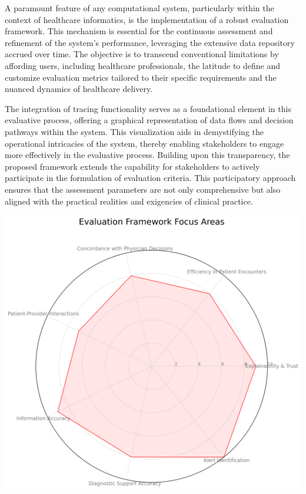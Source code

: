 \documentclass{article}
\begin{document}
A paramount feature of any computational system, particularly within the context of healthcare informatics, is the implementation of a robust evaluation framework. This mechanism is essential for the continuous assessment and refinement of the system's performance, leveraging the extensive data repository accrued over time. The objective is to transcend conventional limitations by affording users, including healthcare professionals, the latitude to define and customize evaluation metrics tailored to their specific requirements and the nuanced dynamics of healthcare delivery.

The integration of tracing functionality serves as a foundational element in this evaluative process, offering a graphical representation of data flows and decision pathways within the system. This visualization aids in demystifying the operational intricacies of the system, thereby enabling stakeholders to engage more effectively in the evaluative process. Building upon this transparency, the proposed framework extends the capability for stakeholders to actively participate in the formulation of evaluation criteria. This participatory approach ensures that the assessment parameters are not only comprehensive but also aligned with the practical realities and exigencies of clinical practice.

\includegraphics[scale=0.5] {0081946a-ae16-4c04-9a1a-238f2112a728.png}
\end{document}
